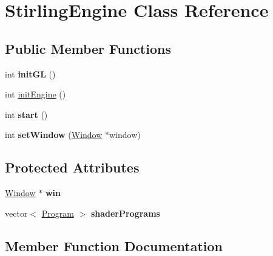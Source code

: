 \hypertarget{class_stirling_engine}{}\section{Stirling\+Engine Class Reference}
\label{class_stirling_engine}
\subsection*{Public Member Functions}
\begin{DoxyCompactItemize}
\item 
\hypertarget{class_stirling_engine_a1c760d825b01fbef138cab917150c399}{}int {\bfseries init\+G\+L} ()\label{class_stirling_engine_a1c760d825b01fbef138cab917150c399}

\item 
int \hyperlink{class_stirling_engine_ae6537f0af2594a1c526b1bbe6863001e}{init\+Engine} ()
\item 
\hypertarget{class_stirling_engine_a6511ea2b176c23301ae0058512494f81}{}int {\bfseries start} ()\label{class_stirling_engine_a6511ea2b176c23301ae0058512494f81}

\item 
\hypertarget{class_stirling_engine_aee67bde31ef4c684955d22395c7e0419}{}int {\bfseries set\+Window} (\hyperlink{class_window}{Window} $\ast$window)\label{class_stirling_engine_aee67bde31ef4c684955d22395c7e0419}

\end{DoxyCompactItemize}
\subsection*{Protected Attributes}
\begin{DoxyCompactItemize}
\item 
\hypertarget{class_stirling_engine_a357fbf0858ee06be73345b8e2788bd6f}{}\hyperlink{class_window}{Window} $\ast$ {\bfseries win}\label{class_stirling_engine_a357fbf0858ee06be73345b8e2788bd6f}

\item 
\hypertarget{class_stirling_engine_aa01d9ecc91aaf5e31e54c249aa113226}{}vector$<$ \hyperlink{class_program}{Program} $>$ {\bfseries shader\+Programs}\label{class_stirling_engine_aa01d9ecc91aaf5e31e54c249aa113226}

\end{DoxyCompactItemize}


\subsection{Member Function Documentation}
\hypertarget{class_stirling_engine_ae6537f0af2594a1c526b1bbe6863001e}{}
